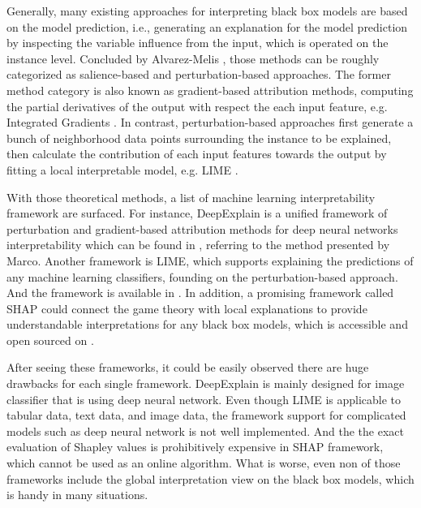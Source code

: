 Generally, many existing approaches for interpreting black box models are based on the model prediction, i.e., generating an explanation for the model prediction by inspecting the variable influence from the input, which is operated on the instance level. Concluded by Alvarez-Melis \cite{alvarez2018robustness}, those methods can be roughly categorized as salience-based and perturbation-based approaches. The former method category is also known as gradient-based attribution methods, computing the partial derivatives of the output with respect the each input feature, e.g. Integrated Gradients \cite{selvaraju2017grad}\cite{sundararajan2017axiomatic}. In contrast, perturbation-based approaches first generate a bunch of neighborhood data points surrounding the instance to be explained, then calculate the contribution of each input features towards the output by fitting a local interpretable model, e.g. LIME \cite{ribeiro2016model}.  

With those theoretical methods, a list of machine learning interpretability framework are surfaced. For instance, DeepExplain is a unified framework of perturbation and gradient-based attribution methods for deep neural networks interpretability which can be found in \cite{deepexplain}, referring to the method presented by Marco\cite{ancona2017towards}. Another framework is LIME, which supports explaining the predictions of any machine learning classifiers, founding on the perturbation-based approach. And the framework is available in \cite{lime}. In addition, a promising framework called SHAP could connect the game theory with local explanations to provide understandable interpretations for any black box models, which is accessible and open sourced on \cite{shap}. 

After seeing these frameworks, it could be easily observed there are huge drawbacks for each single framework. DeepExplain is mainly designed for image classifier that is using deep neural network. Even though LIME is applicable to tabular data, text data, and image data, the framework support for complicated models such as deep neural network is not well implemented. And the the exact evaluation of Shapley values is prohibitively expensive in SHAP framework, which cannot be used as an online algorithm. What is worse, even non of those frameworks include the global interpretation view on the black box models, which is handy in many situations.

